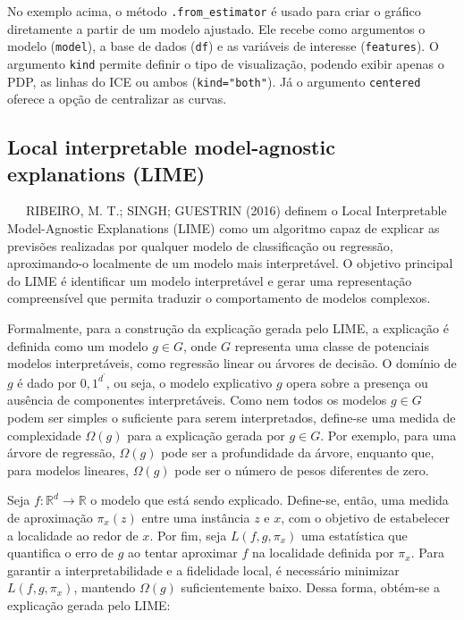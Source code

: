 \documentclass[
  12pt,
  a4paper,
]{scrreprt}
\begin{document}
No exemplo acima, o método \texttt{.from\_estimator} é usado para criar
o gráfico diretamente a partir de um modelo ajustado. Ele recebe como
argumentos o modelo (\texttt{model}), a base de dados (\texttt{df}) e as
variáveis de interesse (\texttt{features}). O argumento \texttt{kind}
permite definir o tipo de visualização, podendo exibir apenas o PDP, as
linhas do ICE ou ambos (\texttt{kind="both"}). Já o argumento
\texttt{centered} oferece a opção de centralizar as curvas.

\subsection{Local interpretable model-agnostic explanations
(LIME)}\label{local-interpretable-model-agnostic-explanations-lime}

~~~RIBEIRO, M. T.; SINGH; GUESTRIN (2016) definem o Local Interpretable
Model-Agnostic Explanations (LIME) como um algoritmo capaz de explicar
as previsões realizadas por qualquer modelo de classificação ou
regressão, aproximando-o localmente de um modelo mais interpretável. O
objetivo principal do LIME é identificar um modelo interpretável e gerar
uma representação compreensível que permita traduzir o comportamento de
modelos complexos.

\vspace{12pt}

Formalmente, para a construção da explicação gerada pelo LIME, a
explicação é definida como um modelo \(g \in G\), onde \(G\) representa
uma classe de potenciais modelos interpretáveis, como regressão linear
ou árvores de decisão. O domínio de \(g\) é dado por \({0, 1}^{d^{'}}\),
ou seja, o modelo explicativo \(g\) opera sobre a presença ou ausência
de componentes interpretáveis. Como nem todos os modelos \(g \in G\)
podem ser simples o suficiente para serem interpretados, define-se uma
medida de complexidade \(\Omega\left(g\right)\) para a explicação gerada
por \(g \in G\). Por exemplo, para uma árvore de regressão,
\(\Omega\left(g\right)\) pode ser a profundidade da árvore, enquanto
que, para modelos lineares, \(\Omega\left(g\right)\) pode ser o número
de pesos diferentes de zero.

\vspace{12pt}

Seja \(f: \mathbb{R}^d \rightarrow \mathbb{R}\) o modelo que está sendo
explicado. Define-se, então, uma medida de aproximação
\(\pi_x\left(z\right)\) entre uma instância \(z\) e \(x\), com o
objetivo de estabelecer a localidade ao redor de \(x\). Por fim, seja
\(L\left(f, g, \pi_x\right)\) uma estatística que quantifica o erro de
\(g\) ao tentar aproximar \(f\) na localidade definida por \(\pi_x\).
Para garantir a interpretabilidade e a fidelidade local, é necessário
minimizar \(L(f, g, \pi_x)\), mantendo \(\Omega(g)\) suficientemente
baixo. Dessa forma, obtém-se a explicação gerada pelo LIME:
\end{document}
